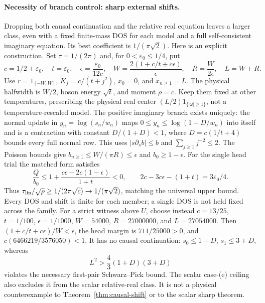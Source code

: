 \documentclass[11pt]{article}
\begin{document}
\paragraph{Necessity of branch control: sharp external shifts.}
Dropping both causal continuation and the relative real equation leaves a larger class, even with a fixed finite-mass DOS for each model and a full self-consistent imaginary equation. Its best coefficient is $1/(\pi\sqrt2)$. Here is an explicit construction. Set $\tau=1/(2\pi)$ and, for $0<\varepsilon_0\le1/4$, put
\[
 c=1/2+\varepsilon_0,\quad t=\varepsilon_0,\quad
 \epsilon=\frac{\varepsilon_0}{12c},\quad
 W=\frac{2(1+c/t+c\epsilon)}{\epsilon},\quad
 R=\frac{W}{2\epsilon},\quad L=W+R.
\]
Use $r=1_{[-W,W]}$, $K_j=c/(t+j^2)$, $x_0=0$, and $x_{n\ge1}=L$. The physical halfwidth is $W/2$, boson energy $\sqrt t$, and moment $\rho=c$. Keep them fixed at other temperatures, prescribing the physical real center $(L/2)1_{\{|\omega|\ge1\}}$, not a temperature-rescaled model. The positive imaginary branch exists uniquely: the normal update in $y_n=\log(s_n/w_n)$ maps $0\le y_n\le\log(1+D/w_n)$ into itself and is a contraction with constant $D/(1+D)<1$, where $D=c(1/t+4)$ bounds every full normal row. This uses $|s\partial_s b|\le b$ and $\sum_{j\ge1}j^{-2}\le2$.
The Poisson bounds give $b_{n\ge1}\le W/(\pi R)\le\epsilon$ and $b_0\ge1-\epsilon$. For the single head trial the matched form satisfies
\[
 \frac{Q}{b_0}\le1+\frac{c\epsilon-2c(1-\epsilon)}{1+t}<0,
 \qquad 2c-3c\epsilon-(1+t)=3\varepsilon_0/4.
\]
Thus $\tau_{\rm lin}/\sqrt\rho\ge1/(2\pi\sqrt c)\to1/(\pi\sqrt2)$, matching the universal upper bound. Every DOS and shift is finite for each member; a single DOS is not held fixed across the family.
For a strict witness above $U$, choose instead $c=13/25$, $t=1/100$, $\epsilon=1/1000$, $W=54000$, $R=27000000$, and $L=27054000$. Then $(1+c/t+c\epsilon)/W<\epsilon$, the head margin is $711/25000>0$, and $c(6466219/3576050)<1$. It has no causal continuation: $s_0\le1+D$, $s_1\le3+D$, whereas
\[
 L^2>\frac43(1+D)(3+D)
\]
violates the necessary first-pair Schwarz--Pick bound. The scalar case-(e) ceiling also excludes it from the scalar relative-real class. It is not a physical counterexample to Theorem~\ref{thm:causal-shift} or to the scalar sharp theorem.
\end{document}
